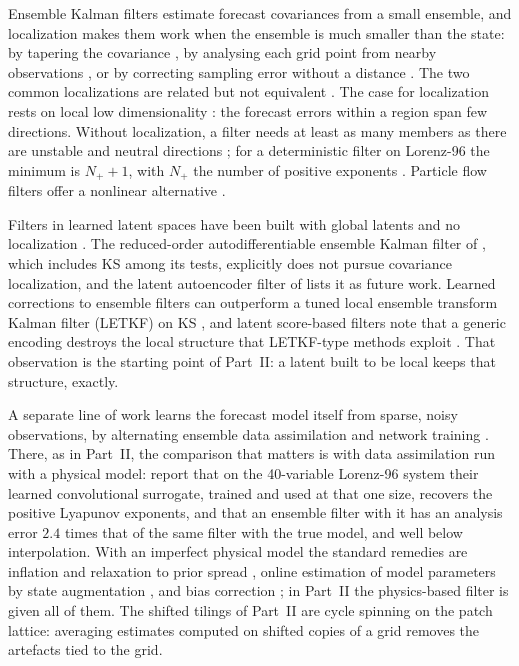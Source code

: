 Ensemble Kalman filters
\citep{burgers1998,houtekamermitchell1998,whitakerhamill2002} estimate
forecast covariances from a small ensemble, and localization makes them
work when the ensemble is much smaller than the state: by tapering the
covariance \citep{houtekamermitchell2001,gaspari1999}, by analysing each
grid point from nearby observations
\citep{ott2004,hunt2007}, or by correcting sampling error without a
distance \citep{anderson2012}. The two common localizations are related
but not equivalent \citep{sakovbertino2011,greybush2011}. The case for
localization rests on local low dimensionality \citep{patil2001}: the
forecast errors within a region span few directions. Without
localization, a filter needs at least as many members as there are
unstable and neutral directions
\citep{trevisan2004,gurumoorthy2017,bocquetcarrassi2017}; for a
deterministic filter on Lorenz-96 the minimum is $N_+ + 1$, with $N_+$ the
number of positive exponents \citep{takeda2026}. Particle flow filters
offer a nonlinear alternative \citep{huvanleeuwen2021}.

Filters in learned latent spaces have been built with global latents and
no localization
\citep{peyron2021,chen2023roadenkf,pasmans2025,tong2026laeenkf}. The
reduced-order autodifferentiable ensemble Kalman filter of
\citet{chen2023roadenkf}, which includes KS among its tests, explicitly
does not pursue covariance localization, and the latent autoencoder
filter of \citet{tong2026laeenkf} lists it as future work. Learned
corrections to ensemble filters can outperform a tuned local ensemble
transform Kalman filter (LETKF) on KS \citep{bach2025}, and latent
score-based filters note that a generic encoding destroys the local
structure that LETKF-type methods exploit \citep{si2025latentensf}. That observation is the starting point of
Part~II: a latent built to be local keeps that structure, exactly.

A separate line of work learns the forecast model itself from sparse, noisy observations, by
alternating ensemble data assimilation and network training \citep{brajard2020,bocquet2020}. There,
as in Part~II, the comparison that matters is with data assimilation run with a physical model:
\citet{brajard2020} report that on the 40-variable Lorenz-96 system their learned
convolutional surrogate, trained and used at that one size, recovers the positive Lyapunov
exponents, and that an ensemble filter with it has an analysis error $2.4$ times that of the same
filter with the true model, and well below interpolation. With an imperfect physical model the standard remedies are
inflation and relaxation to prior spread \citep{whitakerhamill2012}, online estimation of model
parameters by state augmentation \citep{anderson2001,ruiz2013}, and bias correction
\citep{dee2005}; in Part~II the physics-based filter is given all of them. The shifted tilings of
Part~II are cycle spinning \citep{coifmandonoho1995} on the patch lattice: averaging estimates
computed on shifted copies of a grid removes the artefacts tied to the grid.

